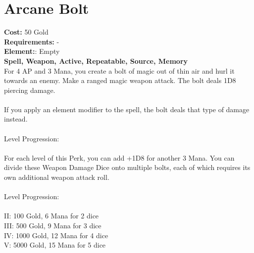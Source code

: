 \section*{Arcane Bolt}
\textbf{Cost:} 50 Gold\\
\textbf{Requirements:} -\\
\textbf{Element:}: Empty\\
\textbf{Spell, Weapon, Active, Repeatable, Source, Memory}\\
For 4 AP and 3 Mana, you create a bolt of magic out of thin air and hurl it towards an enemy. Make a ranged magic weapon attack. The bolt deals 1D8 piercing damage.\\
\\
If you apply an element modifier to the spell, the bolt deals that type of damage instead.\\
\\
Level Progression:\\
\\
For each level of this Perk, you can add +1D8 for another 3 Mana. You can divide these Weapon Damage Dice onto multiple bolts, each of which requires its own additional weapon attack roll.\\
\\
Level Progression:\\
\\
II: 100 Gold, 6 Mana for 2 dice\\
III: 500 Gold, 9 Mana for 3 dice\\
IV: 1000 Gold, 12 Mana for 4 dice\\
V: 5000 Gold, 15 Mana for 5 dice\\
